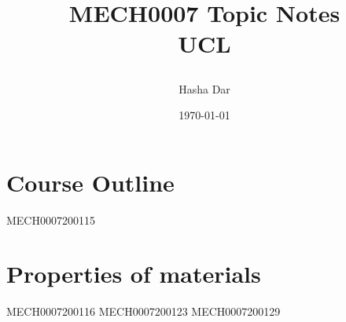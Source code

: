 \documentclass[12pt,a4paper, twoside]{report}
\begin{document}
\title{
  {MECH0007 Topic Notes}\\
  {\large UCL}
  \author{Hasha Dar}
  \date{\today}
}
\maketitle

\tableofcontents
\chapter{Course Outline}
{MECH0007200115}

\chapter{Properties of materials}
{MECH0007200116}
{MECH0007200123}
{MECH0007200129}
\end{document}
